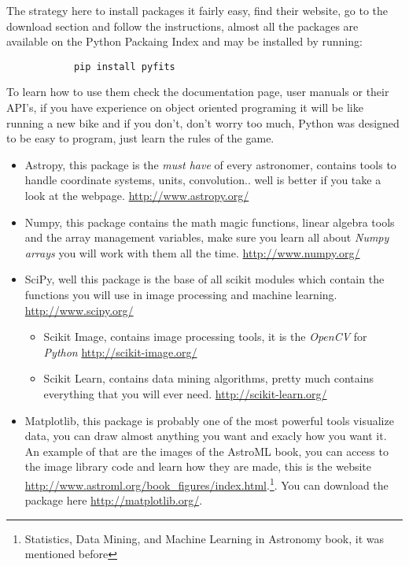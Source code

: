 \documentclass[11pt,fleqn]{book} %
\begin{document}
\begin{description}
\begin{description}
        The strategy here to install packages it fairly easy, find their website, go to the download section and follow the instructions, almost all the packages are available on the Python Packaing Index and may be installed by running:
        \begin{verbatim}
        	pip install pyfits
        \end{verbatim}
        To learn how to use them check the documentation page, user manuals or their API's, if you have experience on object oriented programing it will be like running a new bike and if you don't, don't worry too much, Python was designed to be easy to program, just learn the rules of the game.
        	\begin{itemize}
            	\item Astropy, this package is the \emph{must have} of every astronomer, contains tools to handle coordinate systems, units, convolution.. well is better if you take a look at the webpage. \url{http://www.astropy.org/}
                \item Numpy, this package contains the math magic functions, linear algebra tools and the array management variables, make sure you learn all about \emph{Numpy arrays} you will work with them all the time. \url{http://www.numpy.org/}
                \item SciPy, well this package is the base of all scikit modules which contain the functions you will use in image processing and machine learning. \url{http://www.scipy.org/}
                	\begin{itemize}
                    	\item Scikit Image, contains image processing tools, it is the \emph{OpenCV} for \emph{Python} \url{http://scikit-image.org/}
                        \item Scikit Learn, contains data mining algorithms, pretty much contains everything that you will ever need. \url{http://scikit-learn.org/}
                    \end{itemize}
                \item Matplotlib, this package is probably one of the most powerful tools visualize data, you can draw almost anything you want and exacly how you want it. An example of that are the images of the AstroML book, you can access to the image library code and learn how they are made, this is the website \url{http://www.astroml.org/book_figures/index.html}.\footnote{Statistics, Data Mining, and Machine Learning in Astronomy book, it was mentioned before}. You can download the package here \url{http://matplotlib.org/}.

\end{itemize}
\end{description}
\end{description}
\end{document}
